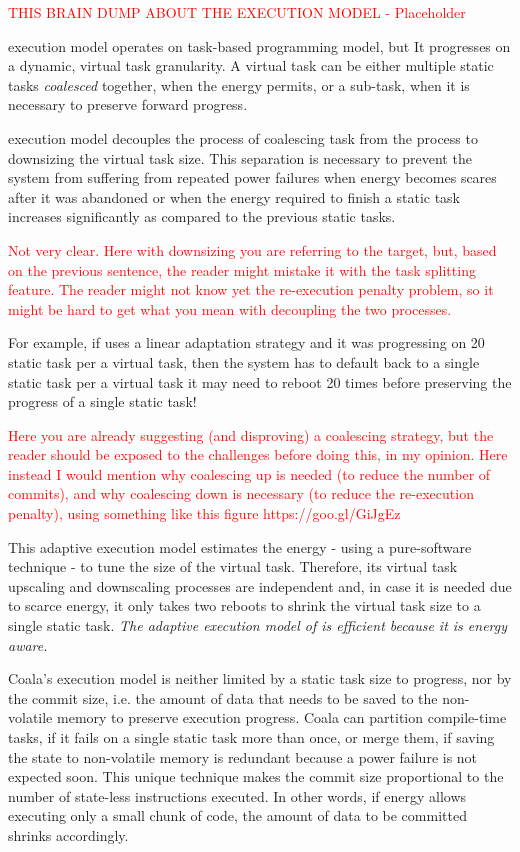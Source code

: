 \textcolor{red}{THIS BRAIN DUMP ABOUT THE EXECUTION MODEL - Placeholder}

\sys execution model operates on task-based programming model, but It progresses on a dynamic, virtual task granularity. A virtual task can be either multiple static tasks \emph{coalesced} together, when the energy permits, or a sub-task, when it is necessary to preserve forward progress.

\sys execution model decouples the process of coalescing task from the process to downsizing the virtual task size. This separation is necessary to prevent the system from suffering from repeated power failures when energy becomes scares after it was abandoned or when the energy required to finish a static task increases significantly as compared to the previous static tasks.
 
\textcolor{red}{Not very clear. Here with downsizing you are referring to the target, but, based on the previous sentence, the reader might mistake it with the task splitting feature. The reader might not know yet the re-execution penalty problem, so it might be hard to get what you mean with decoupling the two processes.}

For example, if \sys uses a linear adaptation strategy and it was progressing on 20 static task per a virtual task, then the system has to default back to a single static task per a virtual task it may need to reboot 20 times before preserving the progress of a single static task!

\textcolor{red}{
Here you are already suggesting (and disproving) a coalescing strategy, but the reader should be exposed to the challenges before doing this, in my opinion. Here instead I would mention why coalescing up is needed (to reduce the number of commits), and why coalescing down is necessary (to reduce the re-execution penalty), using something like this figure https://goo.gl/GiJgEz}


This adaptive execution model estimates the energy - using a pure-software technique - to tune the size of the virtual task. Therefore, its virtual task upscaling and downscaling processes are independent and, in case it is needed due to scarce energy, it only takes two reboots to shrink the virtual task size to a single static task. \emph{The adaptive execution model of \sys is efficient because it is energy aware.}

Coala's execution model is neither limited by a static task size to progress, nor by the commit size, i.e. the amount of data that needs to be saved to the non-volatile memory to preserve execution progress. Coala can partition compile-time tasks, if it fails on a single static task more than once, or merge them, if saving the state to non-volatile memory is redundant because a power failure is not expected soon. This unique technique makes the commit size proportional to the number of state-less instructions executed. In other words, if energy allows executing only a small chunk of code, the amount of data to be committed shrinks accordingly.



